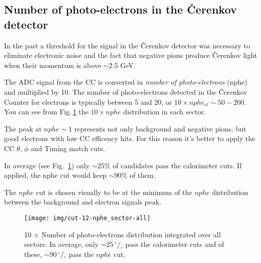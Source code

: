 \subsection{Number of photo-electrons in the \v Cerenkov detector}
\label{sec:cc_cut}
In the past a threshold for the signal in the \v Cerenkov detector was necessary to eliminate
electronic noise and the fact that negative pions produce \v Cerenkov light when
their momentum is above $\sim 2.5$ GeV.

The ADC signal from the CC is converted in
    {\it number of photo-electrons} (nphe) and
multiplied by 10. The number of photo-electrons detected in the \v Cerenkov
Counter for electrons is typically between 5 and 20, or $10\times nphe_{el} \sim 50-200$.
You can see from Fig.\,\ref{fig:cccut_alls} the $10\times nphe$
distribution in each sector.

The peak at $nphe \sim 1$ represents not only background and
negative pions, but good electrons with low CC efficency hits. For this reason
it's better to apply the CC $\theta$, $\phi$ and Timing match cuts.

In average (see Fig.~\ref{fig:cccut_alls}) only $\sim 25\%$ of candidates pass the calorimeter cuts.
If applied, the nphe cut would keep $\sim 90\%$ of them.

The $nphe$ cut is chosen visually to be at the minimum
of the $nphe$ distribution between the background and electron signals peak.


\begin{figure}[ht]
    \centering
    \texttt{[image: img/cut-12-nphe\_sector-all]}
    \caption{10 $\times$ Number of photo-electrons distribution integrated over all sectors.
    In average, only $\sim 25 \,^{\circ\!\!}/\!_\circ$ pass the calorimeter cuts and of these,
        $\sim 90 \,^{\circ\!\!}/\!_\circ$ pass the $nphe$ cut.}
    \label{fig:cccut_alls}
\end{figure}
		


